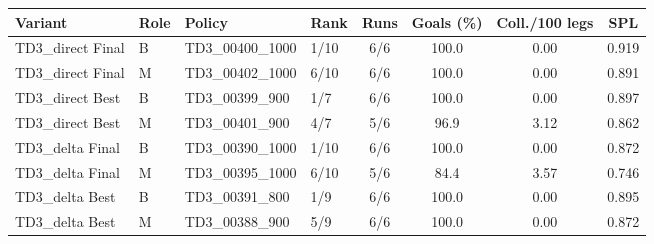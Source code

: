\begin{tabular}{llllcccc}
\midrule[1.5pt]
\textbf{Variant} & \textbf{Role} & \textbf{Policy} & \textbf{Rank} & \textbf{Runs} & \textbf{Goals (\%)} & \textbf{Coll./100 legs} & \textbf{SPL} \\
\midrule[1.5pt]
TD3\_direct Final & B & TD3\_00400\_1000 & 1/10 & 6/6 & 100.0 & 0.00 & 0.919 \\
TD3\_direct Final & M & TD3\_00402\_1000 & 6/10 & 6/6 & 100.0 & 0.00 & 0.891 \\
\midrule
TD3\_direct Best & B & TD3\_00399\_900 & 1/7 & 6/6 & 100.0 & 0.00 & 0.897 \\
TD3\_direct Best & M & TD3\_00401\_900 & 4/7 & 5/6 & 96.9 & 3.12 & 0.862 \\
\midrule
TD3\_delta Final & B & TD3\_00390\_1000 & 1/10 & 6/6 & 100.0 & 0.00 & 0.872 \\
TD3\_delta Final & M & TD3\_00395\_1000 & 6/10 & 5/6 & 84.4 & 3.57 & 0.746 \\
\midrule
TD3\_delta Best & B & TD3\_00391\_800 & 1/9 & 6/6 & 100.0 & 0.00 & 0.895 \\
TD3\_delta Best & M & TD3\_00388\_900 & 5/9 & 6/6 & 100.0 & 0.00 & 0.872 \\
\midrule[1.5pt]
\end{tabular}
